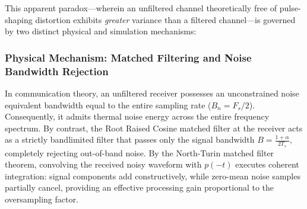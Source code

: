 \documentclass[Markos_Delaportas_1316.tex]{subfiles}
\begin{document}
This apparent paradox—wherein an unfiltered channel theoretically
free of pulse-shaping distortion exhibits \emph{greater}
variance than a filtered channel—is governed by two distinct physical
and simulation mechanisms:

\subsubsection{Physical Mechanism: Matched Filtering and Noise
Bandwidth Rejection}
In communication theory, an unfiltered receiver possesses an
unconstrained noise equivalent bandwidth equal to the entire
sampling rate ($B_n = F_s / 2$). Consequently, it admits thermal
noise energy across the entire frequency spectrum.
By contrast, the Root Raised Cosine matched filter at the receiver
acts as a strictly bandlimited filter that passes only
the signal bandwidth $B = \frac{1+\alpha}{2 T_s}$, completely
rejecting out-of-band noise. By the North-Turin matched filter
theorem, convolving the received noisy waveform with $p(-t)$ executes
coherent integration: signal components add constructively,
while zero-mean noise samples partially cancel, providing an
effective processing gain proportional to the oversampling factor.
\end{document}
